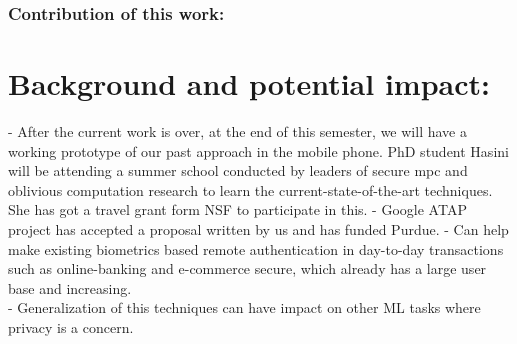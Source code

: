 \documentclass[11pt]{article}
\begin{document}
\subsubsection*{Contribution of this work:}

\section{Background and potential impact:}
- After the current work is over, at the end of this semester, we will have a working prototype of our past approach in the mobile phone. PhD student 
Hasini will be attending a summer school conducted by leaders of secure mpc and oblivious computation research to learn the current-state-of-the-art 
techniques. She has got a travel grant form NSF to participate in this.
- Google ATAP project has accepted a proposal written by us and has funded Purdue.
- Can help make existing biometrics based remote authentication in day-to-day transactions such as online-banking and e-commerce secure, which 
already has a large user base and increasing.\\
- Generalization of this techniques can have impact on other ML tasks where privacy is a concern.


 
\end{document}
